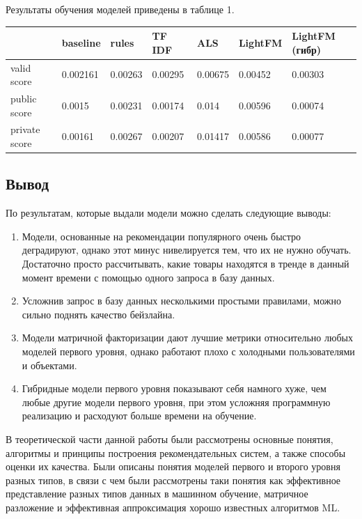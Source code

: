 \documentclass[bachelor, och, coursework]{SCWorks}
\begin{document}
Результаты обучения моделей приведены в таблице 1.

\begin{table}[H]
    \begin{tabular}{|l|l|l|l|l|l|l|}
    \hline
                     & baseline & rules   & TF IDF  & ALS     & LightFM & LightFM (гибр)    \\ \hline
    valid score      & 0.002161 & 0.00263 & 0.00295 & 0.00675 & 0.00452 & 0.00303           \\ \hline
    public score     & 0.0015   & 0.00231 & 0.00174 & 0.014   & 0.00596 & 0.00074           \\ \hline
    private score    & 0.00161  & 0.00267 & 0.00207 & 0.01417 & 0.00586 & 0.00077           \\ \hline
    \end{tabular}
    \end{table}

\subsection{Вывод}
По результатам, которые выдали модели можно сделать следующие выводы:
\begin{enumerate}
    \item Модели, основанные на рекомендации популярного очень быстро деградируют, однако этот минус нивелируется
    тем, что их не нужно обучать. Достаточно просто рассчитывать, какие товары находятся в тренде в данный момент времени
    с помощью одного запроса в базу данных.
    \item Усложнив запрос в базу данных несколькими простыми правилами, можно сильно поднять качество бейзлайна.
    \item Модели матричной факторизации дают лучшие метрики относительно любых моделей первого уровня, однако работают плохо
    с холодными пользователями и объектами.
    \item Гибридные модели первого уровня показывают себя намного хуже, чем любые другие модели первого уровня, при этом усложняя
    программную реализацию и расходуют больше времени на обучение.
\end{enumerate}

\conclusion 
В теоретической части данной работы были рассмотрены основные понятия, алгоритмы и принципы построения рекомендательных систем, а также способы оценки их качества.
Были описаны понятия моделей первого и второго уровня разных типов, в связи с чем были рассмотрены таки понятия как эффективное представление разных типов данных в
машинном обучение, матричное разложение и эффективная аппроксимация хорошо известных алгоритмов ML.
\end{document}
